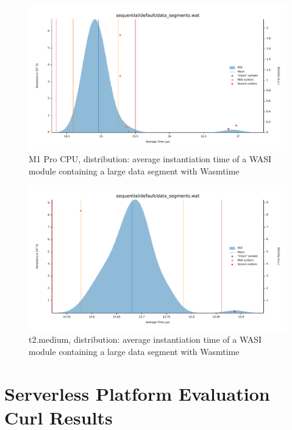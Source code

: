 \begin{figure}[H]
    \centering
        \includegraphics[width=1\linewidth]{images/benches/m1pro_data_segments.pdf}
    \caption{M1 Pro CPU, distribution: average instantiation time of a WASI module containing a large data segment with Wasmtime}
    \label{fig:bench:m1-instantiation:data-segment}
\end{figure}

\begin{figure}[H]
    \centering
        \includegraphics[width=1\linewidth]{images/benches/t2_medium_data_segments.pdf}
    \caption{t2.medium, distribution: average instantiation time of a WASI module containing a large data segment with Wasmtime}
    \label{fig:bench:t2-instantiation:data-segment}
\end{figure}
\newpage

\section*{Serverless Platform Evaluation Curl Results}

